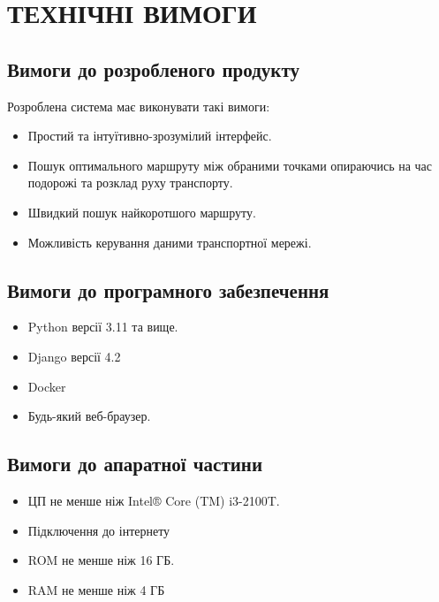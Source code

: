 \begingroup
\renewcommand{\cleardoublepage}{}
\renewcommand{\clearpage}{}
\chapter{ТЕХНІЧНІ ВИМОГИ}
\endgroup


\section{Вимоги до розробленого продукту}
Розроблена система має виконувати такі вимоги:
\begin{itemize}
\item Простий та інтуїтивно-зрозумілий інтерфейс.
\item Пошук оптимального маршруту між обраними точками опираючись на час подорожі та розклад руху транспорту.
\item Швидкий пошук найкоротшого маршруту.
\item Можливість керування даними транспортної мережі.
\end{itemize}

\section{Вимоги до програмного забезпечення}
\begin{itemize}
\item Python версії 3.11 та вище.
\item Django версії 4.2
\item Docker
\item Будь-який веб-браузер.
\end{itemize}		

\section{Вимоги до апаратної частини}
\begin{itemize}
\item ЦП не менше ніж Intel® Core (TM) i3-2100T.
\item Підключення до інтернету
\item ROM не менше ніж 16 ГБ.
\item RAM не менше ніж 4 ГБ
\end{itemize}

\bigskip
\bigskip
\bigskip